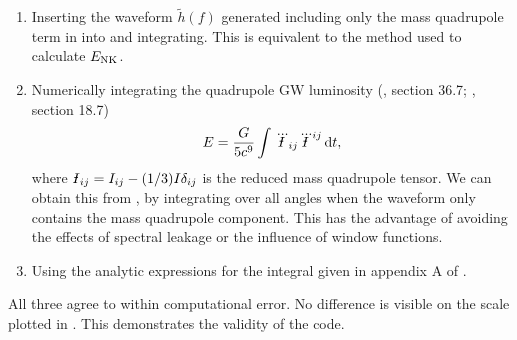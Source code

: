 \begin{enumerate}
\item Inserting the waveform $\widetilde{h}(f)$ generated including only the mass quadrupole term in  into  and integrating. This is equivalent to the method used to calculate $E_\mathrm{NK}$.
\item Numerically integrating the quadrupole GW luminosity (\citealt{Misner1973}, section 36.7; \citealt{Hobson2006}, section 18.7)
\begin{equation}
E = \frac{G}{5c^9}\intd{}{}{\dddot{\Ibar}_{ij}\dddot{\Ibar}^{ij}}{t},
\label{eq:E_quad}
\end{equation}
where $\Ibar_{ij} = I_{ij} - (1/3)I\delta_{ij}$ is the reduced mass quadrupole tensor. We can obtain this from , by integrating over all angles when the waveform only contains the mass quadrupole component. This has the advantage of avoiding the effects of spectral leakage or the influence of window functions.
\item Using the analytic expressions for the integral  given in appendix A of \citet{Gair2005}.
\end{enumerate}
All three agree to within computational error. No difference is visible on the scale plotted in . This demonstrates the validity of the code.

